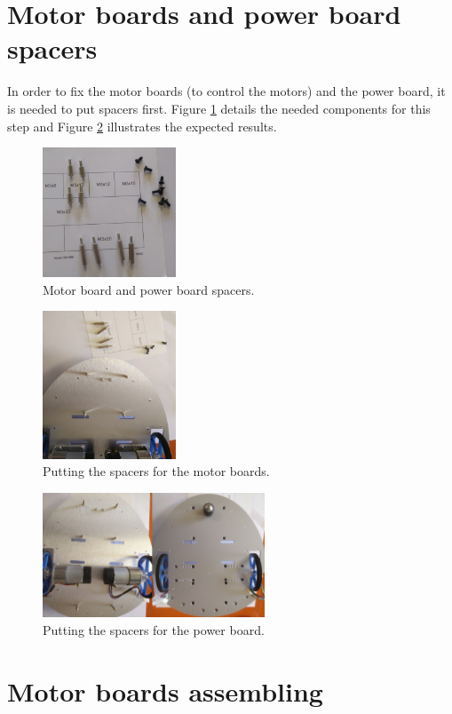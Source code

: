 \documentclass[10pt,a4paper]{report}   %
\begin{document}
\section{Motor boards and power board spacers}

In order to fix the motor boards (to control the motors) and the power board, it is needed to put spacers first. Figure \ref{fig:16} details the needed components for this step and Figure \ref{fig:17} illustrates the expected results.

\begin{figure}[H]
\center
\includegraphics[width=150px]{images/16.jpg}
\caption{Motor board and power board spacers.}
\label{fig:16}
\end{figure}

\begin{figure}[H]
\center
\includegraphics[width=150px]{images/17.jpg}
\caption{Putting the spacers for the motor boards.}
\label{fig:17}
\end{figure}

\begin{figure}[H]
\center
\includegraphics[width=250px]{images/18.jpg}
\caption{Putting the spacers for the power board.}
\label{fig:18}
\end{figure}

\section{Motor boards assembling}
\end{document}
